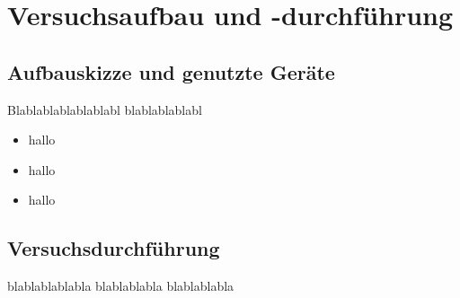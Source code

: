 \chapter{Versuchsaufbau und -durchführung}
\label{sec:durchfuerung}
\section{Aufbauskizze und genutzte Geräte}
\FloatBarrier
Blablablablablablabl
blablablablabl

\begin{itemize}
	\item hallo
	\item hallo
	\item hallo
\end{itemize}

\section{Versuchsdurchführung}
blablablablabla
blablablabla
blablablabla